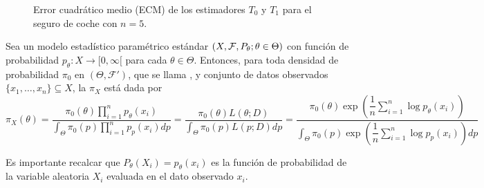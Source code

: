 \begin{figure}
    \centering
    \caption{Error cuadrático medio (ECM) de los estimadores $T_0$ y $T_1$ para el seguro de coche con $n=5$.}
    \label{fig:ecm_estimadores_seguro}
\end{figure}

\begin{definicion}
    Sea un modelo estadístico paramétrico estándar \mbox{$(X, \mathcal{F}, P_{\theta}; \theta \in \Theta)$} con función de probabilidad $p_{\theta}:X\to [0,\infty[$ para cada $\theta\in \Theta$. Entonces, para toda densidad de probabilidad $\pi_0$ en \mbox{$(\Theta, \mathcal{F}')$}, que se llama , y conjunto de datos observados $\{x_1, \ldots, x_n\} \subseteq X$, la  $\pi_{X}$ está dada por
    \begin{equation*}
        \pi_{X}(\theta) = \dfrac{\pi_0(\theta) \prod\limits_{i=1}^{n} p_{\theta}(x_i)}{\int_{\Theta} \pi_0(p) \prod\limits_{i=1}^{n} p_{p}(x_i) dp}= \dfrac{\pi_0(\theta) L(\theta; D)}{\int_{\Theta} \pi_0(p) L(p; D) dp}= \dfrac{\pi_0(\theta)\exp\left(\dfrac{1}{n} \sum\limits_{i=1}^{n} \log p_{\theta}(x_i)\right)}{\int_{\Theta} \pi_0(p) \exp\left(\dfrac{1}{n} \sum\limits_{i=1}^{n} \log p_{p}(x_i)\right) dp}
    \end{equation*}
\end{definicion}

\begin{observacion}
    Es importante recalcar que $P_{\theta}(X_i)=p_{\theta}(x_i)$ es la función de probabilidad de la variable aleatoria $X_i$ evaluada en el dato observado $x_i$.
\end{observacion}

